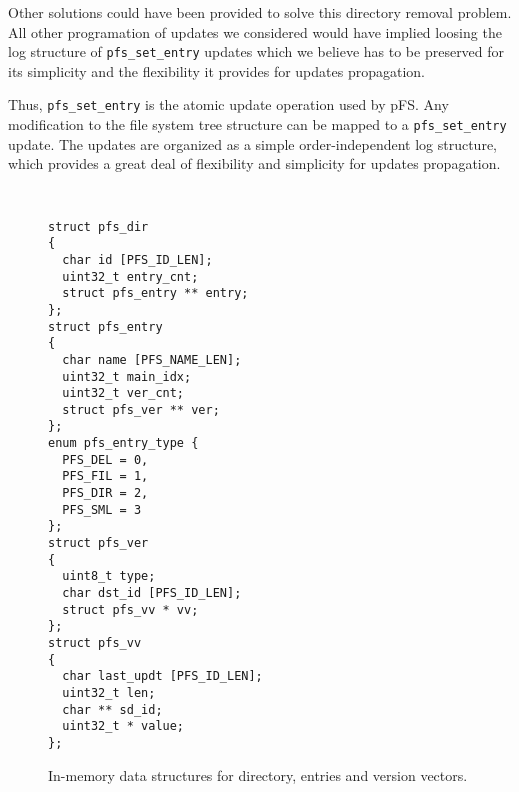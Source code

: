 Other solutions could have been provided to solve this directory
removal problem. All other programation of updates we considered would
have implied loosing the log structure of {\tt pfs\_set\_entry}
updates which we believe has to be preserved for its simplicity and
the flexibility it provides for updates propagation.

Thus, {\tt pfs\_set\_entry} is the atomic update operation used by
pFS. Any modification to the file system tree structure can be mapped
to a {\tt pfs\_set\_entry} update. The updates are organized as a
simple order-independent log structure, which provides a great deal of
flexibility and simplicity for updates propagation.

\begin{figure}[t]
\begin{center}
{\tt \small
\begin{verbatim}
struct pfs_dir
{
  char id [PFS_ID_LEN];
  uint32_t entry_cnt;
  struct pfs_entry ** entry;
};
struct pfs_entry
{
  char name [PFS_NAME_LEN];
  uint32_t main_idx;
  uint32_t ver_cnt; 
  struct pfs_ver ** ver;
};
enum pfs_entry_type {
  PFS_DEL = 0,
  PFS_FIL = 1,
  PFS_DIR = 2,
  PFS_SML = 3 
};
struct pfs_ver
{
  uint8_t type;
  char dst_id [PFS_ID_LEN];
  struct pfs_vv * vv;
};
struct pfs_vv
{ 
  char last_updt [PFS_ID_LEN];
  uint32_t len;
  char ** sd_id;
  uint32_t * value;
};
\end{verbatim}
}
\end{center}
\caption{\label{MemStruct}
{\small In-memory data structures for directory, entries and version
  vectors.}}
\end{figure}

